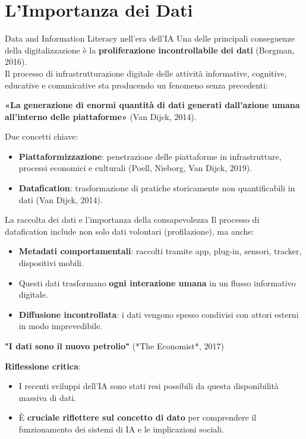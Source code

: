 \documentclass{beamer}
\begin{document}
\section{L'Importanza dei Dati}
%
%
\begin{frame}{Data and Information Literacy nell’era dell’IA}
\small
Una delle principali conseguenze della digitalizzazione è la \textbf{proliferazione incontrollabile dei dati} (Borgman, 2016).\\[0.2cm]

Il processo di infrastrutturazione digitale delle attività informative, cognitive, educative e comunicative sta producendo un fenomeno senza precedenti:

\begin{block}{}
\textbf{«La generazione di enormi quantità di dati generati dall’azione umana all’interno delle piattaforme»} (Van Dijck, 2014).
\end{block}

\vspace{0.3cm}
Due concetti chiave:
\begin{itemize}
    \item \textbf{Piattaformizzazione}: penetrazione delle piattaforme in infrastrutture, processi economici e culturali (Poell, Nieborg, Van Dijck, 2019).
    \item \textbf{Datafication}: trasformazione di pratiche storicamente non quantificabili in dati (Van Dijck, 2014).
\end{itemize}
\end{frame}
%
%
\begin{frame}{La raccolta dei dati e l'importanza della consapevolezza}
\small
Il processo di datafication include non solo dati volontari (profilazione), ma anche:
\begin{itemize}
    \item \textbf{Metadati comportamentali}: raccolti tramite app, plug-in, sensori, tracker, dispositivi mobili.
    \item Questi dati trasformano \textbf{ogni interazione umana} in un flusso informativo digitale.
    \item \textbf{Diffusione incontrollata}: i dati vengono spesso condivisi con attori esterni in modo imprevedibile.
\end{itemize}

\vspace{0.3cm}
\textbf{"I dati sono il nuovo petrolio"} (*The Economist*, 2017)

\vspace{0.3cm}
\textbf{Riflessione critica}:
\begin{itemize}
    \item I recenti sviluppi dell’IA sono stati resi possibili da questa disponibilità massiva di dati.
    \item È \textbf{cruciale riflettere sul concetto di dato} per comprendere il funzionamento dei sistemi di IA e le implicazioni sociali.
\end{itemize}
\end{frame}
\end{document}
